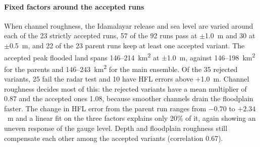 \documentclass[preprint,12pt,authoryear]{elsarticle}
\newcommand{\kmsq}{km\textsuperscript{2}}
\begin{document}
\paragraph{Fixed factors around the accepted runs} When channel roughness, the Idamalayar release and sea level are varied around each of the 23 strictly accepted runs, 57 of the 92 runs pass at $\pm$1.0~m and 30 at $\pm$0.5~m, and 22 of the 23 parent runs keep at least one accepted variant. The accepted peak flooded land spans 146--214~\kmsq{} at $\pm$1.0~m, against 146--198~\kmsq{} for the parents and 146--243~\kmsq{} for the main ensemble. Of the 35 rejected variants, 25 fail the radar test and 10 have HFL errors above +1.0~m. Channel roughness decides most of this: the rejected variants have a mean multiplier of 0.87 and the accepted ones 1.08, because smoother channels drain the floodplain faster. The change in HFL error from the parent run ranges from $-0.70$ to $+2.34$~m and a linear fit on the three factors explains only 20\% of it, again showing an uneven response of the gauge level. Depth and floodplain roughness still compensate each other among the accepted variants (correlation 0.67).
\end{document}
